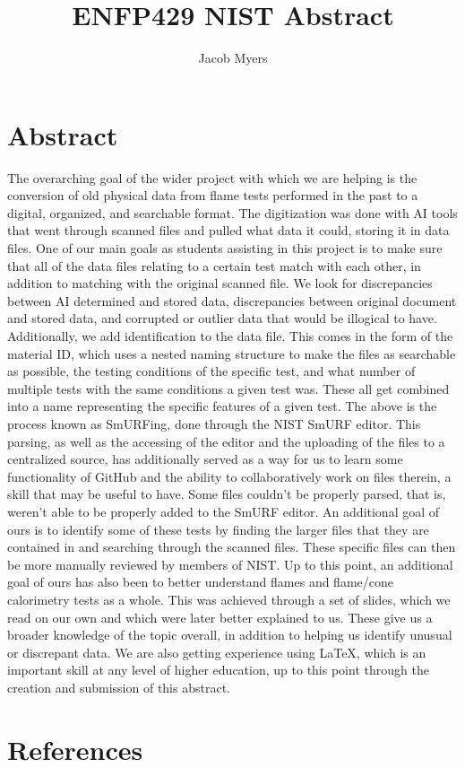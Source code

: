 \documentclass{abstract}
\title{ENFP429 NIST Abstract}
\author{Jacob Myers}
\begin{document}
\maketitle
\section{Abstract}
The overarching goal of the wider project with which we are helping is the conversion of old physical data from flame tests performed in the past to a digital, organized, and searchable format. The digitization was done with AI tools that went through scanned files and pulled what data it could, storing it in data files. One of our main goals as students assisting in this project is to make sure that all of the data files relating to a certain test match with each other, in addition to matching with the original scanned file. We look for discrepancies between AI determined and stored data, discrepancies between original document and stored data, and corrupted or outlier data that would be illogical to have. Additionally, we add identification to the data file. This comes in the form of the material ID, which uses a nested naming structure to make the files as searchable as possible, the testing conditions of the specific test, and what number of multiple tests with the same conditions a given test was. These all get combined into a name representing the specific features of a given test. The above is the process known as SmURFing, done through the NIST SmURF editor. This parsing, as well as the accessing of the editor and the uploading of the files to a centralized source, has additionally served as a way for us to learn some functionality of GitHub and the ability to collaboratively work on files therein, a skill that may be useful to have. Some files couldn’t be properly parsed, that is, weren’t able to be properly added to the SmURF editor. An additional goal of ours is to identify some of these tests by finding the larger files that they are contained in and searching through the scanned files. These specific files can then be more manually reviewed by members of NIST. Up to this point, an additional goal of ours has also been to better understand flames and flame/cone calorimetry tests as a whole. This was achieved through a set of slides, which we read on our own and which were later better explained to us. These give us a broader knowledge of the topic overall, in addition to helping us identify unusual or discrepant data. We are also getting experience using LaTeX, which is an important skill at any level of higher education, up to this point through the creation and submission of this abstract.  

 \cite{babrauskas1982development, brown1988cone,emil1989flammability}


\section{References}
\printbibliography[heading=none]
\end{document}
